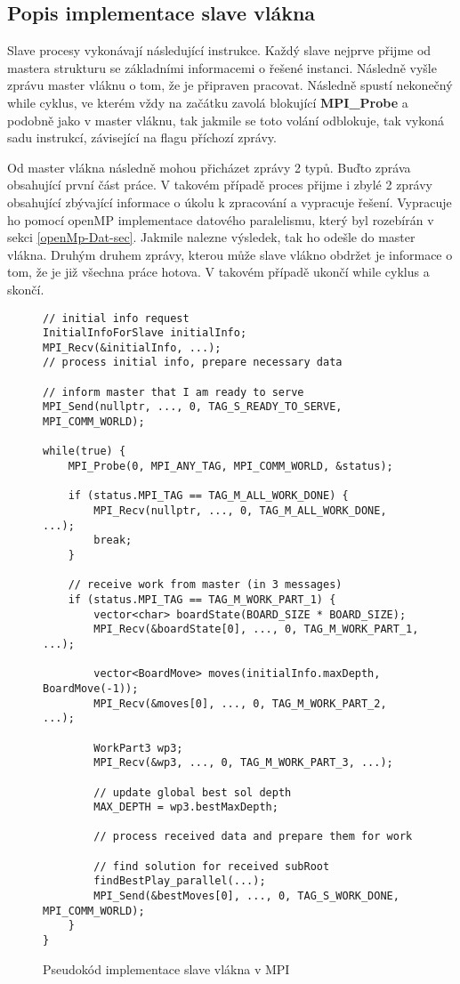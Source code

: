 \documentclass{article} \oddsidemargin=-5mm
\begin{document}
\subsection{Popis implementace slave vlákna}

Slave procesy vykonávají následující instrukce. Každý slave nejprve přijme od mastera strukturu se základními informacemi o řešené instanci. Následně vyšle zprávu master vláknu o tom, že je připraven pracovat. Následně spustí nekonečný while cyklus, ve kterém vždy na začátku zavolá blokující \textbf{MPI\_Probe} a podobně jako v master vláknu, tak jakmile se toto volání odblokuje, tak vykoná sadu instrukcí, závisející na flagu příchozí zprávy.

Od master vlákna následně mohou přicházet zprávy 2 typů. Buďto zpráva obsahující první část práce. V takovém případě proces přijme i zbylé 2 zprávy obsahující zbývající informace o úkolu k zpracování a vypracuje řešení. Vypracuje ho pomocí openMP implementace datového paralelismu, který byl rozebírán v sekci \ref{openMp-Dat-sec}. Jakmile nalezne výsledek, tak ho odešle do master vlákna. Druhým druhem zprávy, kterou může slave vlákno obdržet je informace o tom, že je již všechna práce hotova. V takovém případě ukončí while cyklus a skončí.

\begin{figure}
\centering
\begin{BVerbatim}
// initial info request
InitialInfoForSlave initialInfo;
MPI_Recv(&initialInfo, ...);
// process initial info, prepare necessary data

// inform master that I am ready to serve
MPI_Send(nullptr, ..., 0, TAG_S_READY_TO_SERVE, MPI_COMM_WORLD);

while(true) {
    MPI_Probe(0, MPI_ANY_TAG, MPI_COMM_WORLD, &status);

    if (status.MPI_TAG == TAG_M_ALL_WORK_DONE) {
        MPI_Recv(nullptr, ..., 0, TAG_M_ALL_WORK_DONE, ...);
        break;
    }

    // receive work from master (in 3 messages)
    if (status.MPI_TAG == TAG_M_WORK_PART_1) {
        vector<char> boardState(BOARD_SIZE * BOARD_SIZE);
        MPI_Recv(&boardState[0], ..., 0, TAG_M_WORK_PART_1, ...);

        vector<BoardMove> moves(initialInfo.maxDepth, BoardMove(-1));
        MPI_Recv(&moves[0], ..., 0, TAG_M_WORK_PART_2, ...);

        WorkPart3 wp3;
        MPI_Recv(&wp3, ..., 0, TAG_M_WORK_PART_3, ...);

        // update global best sol depth
        MAX_DEPTH = wp3.bestMaxDepth;

        // process received data and prepare them for work

        // find solution for received subRoot
        findBestPlay_parallel(...);
        MPI_Send(&bestMoves[0], ..., 0, TAG_S_WORK_DONE, MPI_COMM_WORLD);
    }
}
\end{BVerbatim}
\caption{Pseudokód implementace slave vlákna v MPI}
\label{mpi-slave}
\end{figure}
\end{document}
